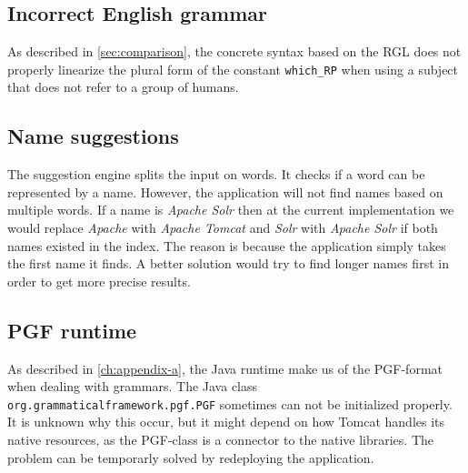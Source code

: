 %
\subsection*{Incorrect English grammar}
As described in \autoref{sec:comparison}, the concrete syntax based on the RGL does not properly linearize the plural form of the constant \texttt{which\_RP} when using a subject that does not refer to a group of humans.

\subsection*{Name suggestions}
The suggestion engine splits the input on words. It checks if a word can be represented by a name. However, the application will not find names based on multiple words. If a name is \emph{Apache Solr} then at the current implementation we would replace \emph{Apache} with \emph{Apache Tomcat} and \emph{Solr} with \emph{Apache Solr} if both names existed in the index. The reason is because the application simply takes the first name it finds. A better solution would try to find longer names first in order to get more precise results.

\subsection*{PGF runtime}
As described in \autoref{ch:appendix-a}, the Java runtime make us of the PGF-format when dealing with grammars. The Java class \texttt{org.grammaticalframework.pgf.PGF} sometimes can not be initialized properly. It is unknown why this occur, but it might depend on how Tomcat handles its native resources, as the PGF-class is a connector to the native libraries. The problem can be temporarly solved by redeploying the application.

